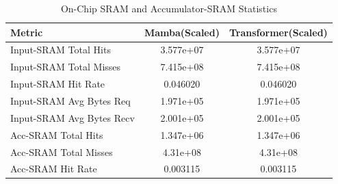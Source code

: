 \begin{table}[h]\centering
    \caption{On-Chip SRAM and Accumulator-SRAM Statistics}
    \label{tab:sram_detailed}
    \begin{tabular}{lcc}\hline
    Metric & Mamba(Scaled) & Transformer(Scaled) \\\hline
        Input-SRAM Total Hits & 3.577e+07 & 3.577e+07 \\
    Input-SRAM Total Misses & 7.415e+08 & 7.415e+08 \\
    Input-SRAM Hit Rate & 0.046020 & 0.046020 \\
    Input-SRAM Avg Bytes Req & 1.971e+05 & 1.971e+05 \\
    Input-SRAM Avg Bytes Recv & 2.001e+05 & 2.001e+05 \\
    Acc-SRAM Total Hits & 1.347e+06 & 1.347e+06 \\
    Acc-SRAM Total Misses & 4.31e+08 & 4.31e+08 \\
    Acc-SRAM Hit Rate & 0.003115 & 0.003115 \\
\hline\end{tabular}\end{table}
